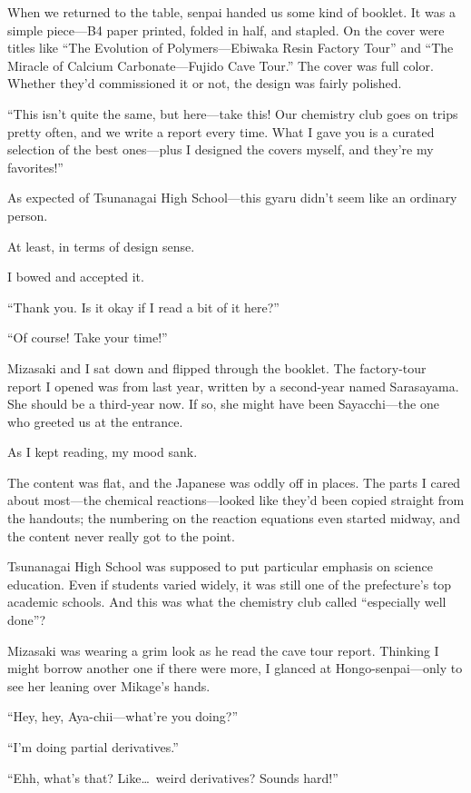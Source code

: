 \documentclass[
    a4paper,
    12pt,
    twoside,
    openany,
    UTF8,
    fontset=windows
]{ctexbook}
\begin{document}
When we returned to the table, senpai handed us some kind of booklet. It was a simple piece---B4 paper printed, folded in half, and stapled. On the cover were titles like ``The Evolution of Polymers---Ebiwaka Resin Factory Tour'' and ``The Miracle of Calcium Carbonate---Fujido Cave Tour.'' The cover was full color. Whether they'd commissioned it or not, the design was fairly polished.

``This isn't quite the same, but here---take this! Our chemistry club goes on trips pretty often, and we write a report every time. What I gave you is a curated selection of the best ones---plus I designed the covers myself, and they're my favorites!''

As expected of Tsunanagai High School---this gyaru didn't seem like an ordinary person.

At least, in terms of design sense.

I bowed and accepted it.

``Thank you. Is it okay if I read a bit of it here?''

``Of course! Take your time!''

Mizasaki and I sat down and flipped through the booklet. The factory-tour report I opened was from last year, written by a second-year named Sarasayama. She should be a third-year now. If so, she might have been Sayacchi---the one who greeted us at the entrance.

As I kept reading, my mood sank.

The content was flat, and the Japanese was oddly off in places. The parts I cared about most---the chemical reactions---looked like they'd been copied straight from the handouts; the numbering on the reaction equations even started midway, and the content never really got to the point.

Tsunanagai High School was supposed to put particular emphasis on science education. Even if students varied widely, it was still one of the prefecture's top academic schools. And this was what the chemistry club called ``especially well done''?

Mizasaki was wearing a grim look as he read the cave tour report. Thinking I might borrow another one if there were more, I glanced at Hongo-senpai---only to see her leaning over Mikage's hands.

``Hey, hey, Aya-chii---what're you doing?''

``I'm doing partial derivatives.''

``Ehh, what's that? Like\dots\ weird derivatives? Sounds hard!''
\end{document}
